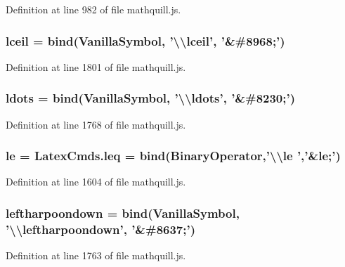 Definition at line 982 of file mathquill.\-js.

\subsubsection[{lceil}]{ lceil = {\bf bind}({\bf Vanilla\-Symbol}, '\textbackslash{}\textbackslash{}lceil', '\&\#8968;')}\label{mathquill_8js_a26e7e54a78e827cb810172e02a568585}


Definition at line 1801 of file mathquill.\-js.

\subsubsection[{ldots}]{ ldots = {\bf bind}({\bf Vanilla\-Symbol}, '\textbackslash{}\textbackslash{}ldots', '\&\#8230;')}\label{mathquill_8js_a2c7cc2d521bfd1f6b5b8cdf38040b989}


Definition at line 1768 of file mathquill.\-js.

\subsubsection[{le}]{ le = Latex\-Cmds.\-leq = {\bf bind}({\bf Binary\-Operator},'\textbackslash{}\textbackslash{}le ','\&le;')}\label{mathquill_8js_aadc543fb0e95834de5c8f27dfa3a527a}


Definition at line 1604 of file mathquill.\-js.

\subsubsection[{leftharpoondown}]{ leftharpoondown = {\bf bind}({\bf Vanilla\-Symbol}, '\textbackslash{}\textbackslash{}leftharpoondown', '\&\#8637;')}\label{mathquill_8js_a8ad24aa221c1e64e1be7aba53f72b0c7}


Definition at line 1763 of file mathquill.\-js.

